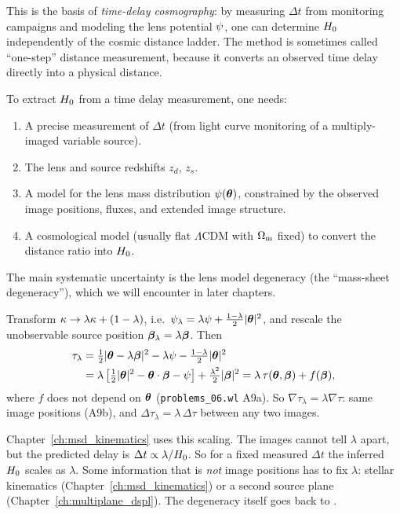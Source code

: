 This is the basis of \emph{time-delay cosmography}: by measuring
$\Delta t$ from monitoring campaigns and modeling the lens potential
$\psi$, one can determine $H_0$ independently of the
cosmic distance ladder.  The method is sometimes called ``one-step''
distance measurement, because it converts an observed time delay
directly into a physical distance.

\begin{remark}
To extract $H_0$ from a time delay measurement, one needs:
\begin{enumerate}[nosep]
    \item A precise measurement of $\Delta t$ (from light curve
          monitoring of a multiply-imaged variable source).
    \item The lens and source redshifts $z_d$, $z_s$.
    \item A model for the lens mass distribution $\psi(\boldsymbol{\theta})$,
          constrained by the observed image positions, fluxes, and
          extended image structure.
    \item A cosmological model (usually flat $\Lambda$CDM with $\Omega_{\mathrm{m}}$
          fixed) to convert the distance ratio into $H_0$.
\end{enumerate}
The main systematic uncertainty is the lens model degeneracy (the
``mass-sheet degeneracy''), which we will encounter in later chapters.
\end{remark}

\begin{derivation}
Transform $\kappa\to\lambda\kappa+(1-\lambda)$, i.e.\
$\psi_\lambda = \lambda\psi+\tfrac{1-\lambda}{2}|\boldsymbol{\theta}|^2$, and rescale the
unobservable source position $\boldsymbol{\beta}_\lambda = \lambda\boldsymbol{\beta}$.  Then
\begin{align*}
  \tau_\lambda &= \tfrac{1}{2}|\boldsymbol{\theta}-\lambda\boldsymbol{\beta}|^2-\lambda\psi-\tfrac{1-\lambda}{2}|\boldsymbol{\theta}|^2\\
  &= \lambda\left[\tfrac{1}{2}|\boldsymbol{\theta}|^2-\boldsymbol{\theta}\cdot\boldsymbol{\beta}-\psi\right]+\tfrac{\lambda^2}{2}|\boldsymbol{\beta}|^2
   = \lambda\,\tau(\boldsymbol{\theta},\boldsymbol{\beta})+f(\boldsymbol{\beta}),
\end{align*}
where $f$ does not depend on $\boldsymbol{\theta}$ (\texttt{problems\_06.wl} A9a).  So
$\nabla\tau_\lambda = \lambda\nabla\tau$: same image positions (A9b), and
$\Delta\tau_\lambda = \lambda\,\Delta\tau$ between any two images.
\end{derivation}

\begin{bridge}[$\Delta t\propto\lambda$: the mass-sheet transformation]
Chapter~\ref{ch:msd_kinematics} uses this scaling.  The images
cannot tell $\lambda$ apart, but the predicted delay is $\Delta t\propto\lambda/H_0$.
So for a fixed measured $\Delta t$ the inferred $H_0$ scales as $\lambda$.
Some information that is \emph{not} image positions has to fix $\lambda$:
stellar kinematics (Chapter~\ref{ch:msd_kinematics}) or a second source
plane (Chapter~\ref{ch:multiplane_dspl}).  The degeneracy itself goes back to
\citet{falco_gorenstein_shapiro_1985}.
\end{bridge}


